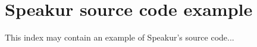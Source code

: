 \chapter{Speakur source code example}
%

This index may contain an example of Speakur's source code...


